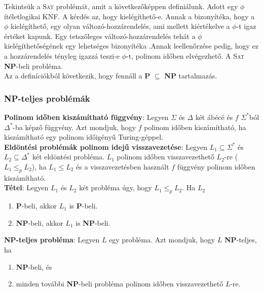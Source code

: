 \documentclass[margin=0px]{article}
\begin{document}
	Tekintsük a \textsc{Sat} problémát, amit a következőképpen definiálunk. Adott egy $\phi$ ítéletlogikai KNF.
	A kérdés az, hogy kielégíthető-e. Annak a bizonyítéka, hogy	a $\phi$ kielégíthető, egy olyan változó-hozzárendelés,
	ami mellett kiértékelve a $\phi$-t igaz értéket kapunk. Egy tetszőleges változó-hozzárendelés tehát a $\phi$
	kielégíthetőségének egy lehetséges bizonyítéka .Annak leellenőrzése pedig, hogy ez a
	hozzárendelés tényleg igazzá teszi-e $\phi$-t, polinom időben elvégezhető. A \textsc{Sat}
	\textbf{NP}-beli probléma.\\
	
	\noindent Az a definíciókból következik, hogy fennáll a \textbf{P} $\subseteq$ \textbf{NP} tartalmazás.
	
	\subsubsection{NP-teljes problémák}
	
	\noindent \textbf{Polinom időben kiszámítható függvény}: Legyen $\Sigma$ és $\Delta$ két ábécé és $f$ $\Sigma^{*}$ból
	$\Delta^{*}$-ba képző függvény. Azt mondjuk, hogy $f$ polinom időben kiszámítható, ha kiszámítható egy polinom
	időigényű Turing-géppel.\\
	
	\noindent \textbf{Eldöntési problémák polinom idejű visszavezetése}:
	Legyen $L_{1} \subseteq \Sigma^{*}$ és $L_{2} \subseteq \Delta^{*}$	két eldöntési probléma.
	$L_{1}$ polinom időben visszavezethető $L_{2}$-re ($L_{1} \leq_{p} L_{2}$), ha $L_{1} \leq L_{2}$ és
	a visszavezetésben használt $f$ függvény polinom időben kiszámítható.\\
	
	\noindent \textbf{Tétel}: Legyen $L_{1}$ és $L_{2}$ két probléma úgy, hogy $L_{1} \leq_{p} L_{2}$. Ha $L_{2}$
	
	\begin{enumerate}
		\item	\textbf{P}-beli, akkor $L_{1}$ is \textbf{P}-beli.
		
		\item	\textbf{NP}-beli, akkor $L_{1}$ is \textbf{NP}-beli.
	\end{enumerate}
	
	\noindent \textbf{NP-teljes probléma}: Legyen $L$ egy probléma. Azt mondjuk, hogy $L$ \textbf{NP}-teljes, ha
	
	\begin{enumerate}
		\item	\textbf{NP}-beli, és
		
		\item	minden további \textbf{NP}-beli probléma polinom időben visszavezethető $L$-re.
			
	\end{enumerate}
	
\end{document}
